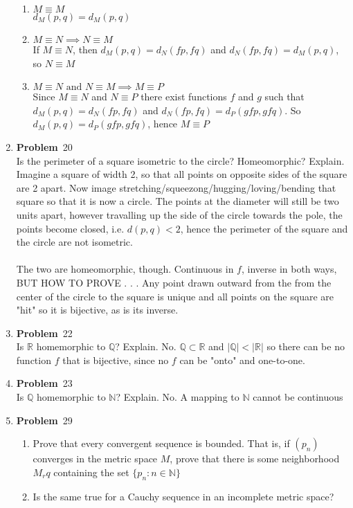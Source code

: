 \documentclass[12pt]{amsart}
\newcommand{\benu}{\begin{enumerate}}
\newcommand{\eenu}{\end{enumerate}}
\theoremstyle{definition}
\newcommand{\mbR}{\mathbb{R}}
\newcommand{\mbN}{\mathbb{N}}
\newcommand{\mbQ}{\mathbb{Q}}
\newcommand{\itep}{\item {\bfseries Problem}\ }
\begin{document}
\begin{enumerate}[series=p]
\benu
\item $M \equiv M$\\
$d_M(p,q) = d_M(p,q)$
\item $M \equiv N \implies N \equiv M$\\
If $M \equiv N$, then $d_M(p,q) = d_N(fp, fq)$ and $d_N(fp, fq) = d_M(p,q)$, so $N \equiv M$
\item $M \equiv N \text{ and }  N \equiv M \implies M \equiv P$\\
Since $M \equiv N$ and $N \equiv P$ there exist functions $f$ and $g$ such that $d_M(p,q) = d_N(fp, fq)$ and $d_N(fp, fq) = d_P(gfp, gfq)$.  So $d_M(p,q) =  d_P(gfp, gfq)$, hence $M \equiv P$
\eenu
\newpage

\itep 20\\
Is the perimeter of a square isometric to the circle?  Homeomorphic?  Explain.
Imagine a square of width 2, so that all points on opposite sides of the square are 2 apart.  Now image stretching/squeezong/hugging/loving/bending that square so that it is now a circle.  The points at the diameter will still be two units apart, however travalling up the side of the circle towards the pole, the points become closed, i.e. $d(p,q) < 2$, hence the perimeter of the square and the circle are not isometric.\\
\\
The two are homeomorphic, though.  Continuous in $f$, inverse in both ways, BUT HOW TO PROVE . . .  Any point drawn outward from the from the center of the circle to the square is unique and all points on the square are "hit" so it is bijective, as is its inverse.
\newpage

\itep 22\\
Is $\mbR$ homemorphic to $\mbQ$?  Explain.
No.  $\mbQ \subset \mbR$ and $|\mbQ| < |\mbR|$ so there can be no function $f$ that is bijective, since no $f$ can be "onto" and one-to-one.
\newpage

\itep 23\\
Is $\mbQ$ homemorphic to $\mbN$?  Explain.
No.  A mapping to $\mbN$ cannot be continuous
\newpage

\itep 29\\
\benu
\item Prove that every convergent sequence is bounded.  That is, if $(p_n)$ converges in the metric space $M$, prove that there is some neighborhood $M_rq$ containing the set $\{p_n:n\in \mbN\}$
\item Is the same true for a Cauchy sequence in an incomplete metric space?
\eenu
\newpage



\end{enumerate}
\end{document}
